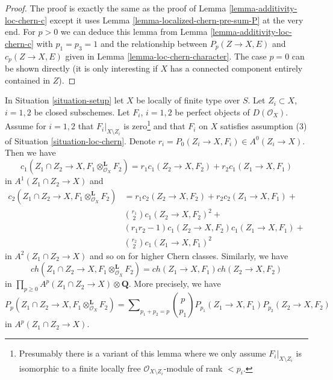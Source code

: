 \begin{proof}
The proof is exactly the same as the proof of
Lemma \ref{lemma-additivity-loc-chern-c}
except it uses
Lemma \ref{lemma-localized-chern-pre-sum-P}
at the very end. For $p > 0$ we can deduce this lemma
from Lemma \ref{lemma-additivity-loc-chern-c} with $p_1 = p_3 = 1$
and the relationship between $P_p(Z \to X, E)$ and $c_p(Z \to X, E)$ given in
Lemma \ref{lemma-loc-chern-character}. The case $p = 0$ can be shown
directly (it is only interesting if $X$ has a connected component
entirely contained in $Z$).
\end{proof}

\begin{lemma}
\label{lemma-loc-chern-tensor-product}
In Situation \ref{situation-setup} let $X$ be locally of finite type over $S$.
Let $Z_i \subset X$, $i = 1, 2$ be closed subschemes. Let $F_i$, $i = 1, 2$
be perfect objects of $D(\mathcal{O}_X)$. Assume for $i = 1, 2$ that
$F_i|_{X \setminus Z_i}$ is zero\footnote{Presumably there
is a variant of this lemma where we only assume $F_i|_{X \setminus Z_i}$
is isomorphic to a finite locally free $\mathcal{O}_{X \setminus Z_i}$-module
of rank $< p_i$.} and that $F_i$ on $X$ satisfies assumption
(3) of Situation \ref{situation-loc-chern}. Denote
$r_i = P_0(Z_i \to X, F_i) \in A^0(Z_i \to X)$.
Then we have
$$
c_1(Z_1 \cap Z_2 \to X, F_1 \otimes_{\mathcal{O}_X}^\mathbf{L} F_2) =
r_1 c_1(Z_2 \to X, F_2) + r_2 c_1(Z_1 \to X, F_1)
$$
in $A^1(Z_1 \cap Z_2 \to X)$ and
\begin{align*}
c_2(Z_1 \cap Z_2 \to X, F_1 \otimes_{\mathcal{O}_X}^\mathbf{L} F_2)
& =
r_1 c_2(Z_2 \to X, F_2) +
r_2 c_2(Z_1 \to X, F_1) + \\
& {r_1 \choose 2} c_1(Z_2 \to X, F_2)^2 + \\
& (r_1r_2 - 1) c_1(Z_2 \to X, F_2)c_1(Z_1 \to X, F_1) + \\
& {r_2 \choose 2} c_1(Z_1 \to X, F_1)^2
\end{align*}
in $A^2(Z_1 \cap Z_2 \to X)$ and so on for higher Chern classes.
Similarly, we have
$$
ch(Z_1 \cap Z_2 \to X, F_1 \otimes_{\mathcal{O}_X}^\mathbf{L} F_2) =
ch(Z_1 \to X, F_1) ch(Z_2 \to X, F_2)
$$
in $\prod_{p \geq 0} A^p(Z_1 \cap Z_2 \to X) \otimes \mathbf{Q}$.
More precisely, we have
$$
P_p(Z_1 \cap Z_2 \to X, F_1 \otimes_{\mathcal{O}_X}^\mathbf{L} F_2) =
\sum\nolimits_{p_1 + p_2 = p}
{p \choose p_1} P_{p_1}(Z_1 \to X, F_1) P_{p_2}(Z_2 \to X, F_2)
$$
in $A^p(Z_1 \cap Z_2 \to X)$.
\end{lemma}

